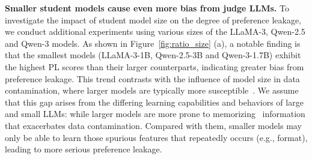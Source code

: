 \documentclass{article} %
\begin{document}

\textbf{Smaller student models cause even more bias from judge LLMs.} To investigate the impact of student model size on the degree of preference leakage, we conduct additional experiments using various sizes of the LLaMA-3, Qwen-2.5 and Qwen-3 models. As shown in Figure~\ref{fig:ratio_size} (a), a notable finding is that the smallest models (LLaMA-3-1B, Qwen-2.5-3B and Qwen-3-1.7B) exhibit the highest PL scores than their larger counterparts, indicating greater bias from preference leakage. This trend contrasts with the influence of model size in data contamination, where larger models are typically more susceptible~\cite{bordt2023elephants}. We assume that this gap arises from the differing learning capabilities and behaviors of large and small LLMs: while larger models are more prone to memorizing~\cite{duan2024uncovering} information that exacerbates data contamination. Compared with them, smaller models may only be able to learn those spurious features that repeatedly occurs (e.g., format), leading to more serious preference leakage.

\end{document}
